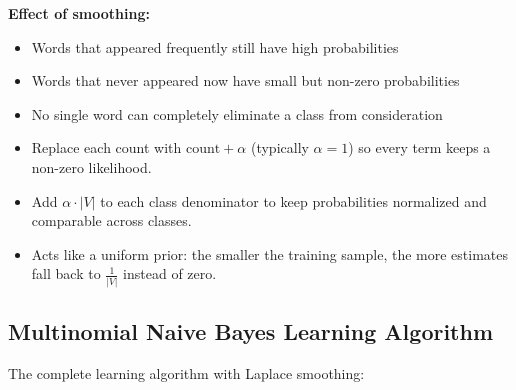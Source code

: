 \documentclass[11pt,a4paper]{article}
\theoremstyle{definition}
\theoremstyle{plain}
\theoremstyle{remark}
\begin{document}
\textbf{Effect of smoothing:}
\begin{itemize}
    \item Words that appeared frequently still have high probabilities
    \item Words that never appeared now have small but non-zero probabilities
    \item No single word can completely eliminate a class from consideration
\end{itemize}

\begin{tcolorbox}[colback=orange!5!white,colframe=orange!75!black,title=\textbf{Laplace Smoothing Essentials}]
\begin{itemize}
    \item Replace each count with $\text{count} + \alpha$ (typically $\alpha = 1$) so every term keeps a non-zero likelihood.
    \item Add $\alpha \cdot |V|$ to each class denominator to keep probabilities normalized and comparable across classes.
    \item Acts like a uniform prior: the smaller the training sample, the more estimates fall back to $\frac{1}{|V|}$ instead of zero.
\end{itemize}
\end{tcolorbox}

\subsection{Multinomial Naive Bayes Learning Algorithm}

The complete learning algorithm with Laplace smoothing:
\end{document}
